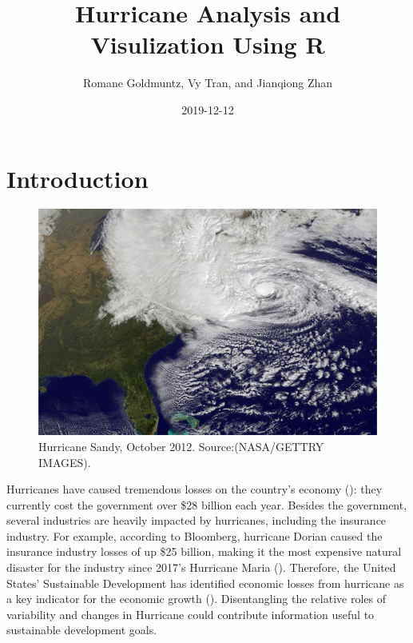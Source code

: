 \documentclass[]{book}
\title{Hurricane Analysis and Visulization Using R}
\author{Romane Goldmuntz, Vy Tran, and Jianqiong Zhan}
\date{2019-12-12}
\begin{document}
\maketitle

{
\setcounter{tocdepth}{1}
\tableofcontents
}
\hypertarget{intro}{%
\chapter{Introduction}\label{intro}}

\begin{figure}
\centering
\includegraphics{../images/sandy-hurricane-1.jpg}
\caption{Hurricane Sandy, October 2012. Source:(NASA/GETTRY IMAGES).}
\end{figure}

Hurricanes have caused tremendous losses on the country's economy (\citet{Winkle2018}): they currently cost the government over \$28 billion each year. Besides the government, several industries are heavily impacted by hurricanes, including the insurance industry. For example, according to Bloomberg, hurricane Dorian caused the insurance industry losses of up \$25 billion, making it the most expensive natural disaster for the industry since 2017's Hurricane Maria (\citet{DSouza2019}). Therefore, the United States' Sustainable Development has identified economic losses from hurricane as a key indicator for the economic growth (\citet{SDG2018}). Disentangling the relative roles of variability and changes in Hurricane could contribute information useful to sustainable development goals.
\end{document}
